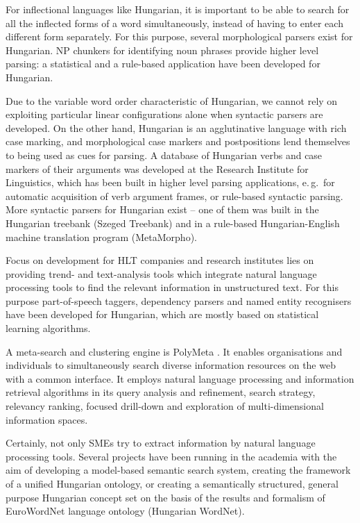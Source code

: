 \begin{multicols}{2}
  For inflectional languages like Hungarian, it is important to be able to search for all the inflected forms of a word simultaneously, instead of having to enter each different form separately. For this purpose, several morphological parsers exist for Hungarian. NP chunkers for identifying noun phrases provide higher level parsing: a statistical and a rule-based application have been developed for Hungarian. 

  Due to the variable word order characteristic of Hungarian, we cannot rely on exploiting particular linear configurations alone when syntactic parsers are developed. On the other hand, Hungarian is an agglutinative language with rich case marking, and morphological case markers and postpositions lend themselves to being used as cues for parsing. A database of Hungarian verbs and case markers of their arguments was developed at the Research Institute for Linguistics, which has been built in higher level parsing applications, e.\,g.~for automatic acquisition of verb argument frames, or rule-based syntactic parsing. More syntactic parsers for Hungarian exist -- one of them was built in the Hungarian treebank (Szeged Treebank) and in a rule-based Hungarian-English machine translation program (MetaMorpho).

  Focus on development for HLT companies and research institutes lies on providing trend- and text-analysis tools which integrate natural language processing tools to find the relevant information in unstructured text. For this purpose part-of-speech taggers, dependency parsers and named entity recognisers have been developed for Hungarian, which are mostly based on statistical learning algorithms.

  A meta-search and clustering engine is PolyMeta \cite{polymeta}. It enables organisations and individuals to simultaneously search diverse information resources on the web with a common interface. It employs natural language processing and information retrieval algorithms in its query analysis and refinement, search strategy, relevancy ranking, focused drill-down and exploration of multi-dimensional information spaces.

  Certainly, not only SMEs try to extract information by natural language processing tools. Several projects have been running in the academia with the aim of developing a model-based semantic search system, creating the framework of a unified Hungarian ontology, or creating a semantically structured, general purpose Hungarian concept set on the basis of the results and formalism of EuroWordNet language ontology (Hungarian WordNet).


\end{multicols}
